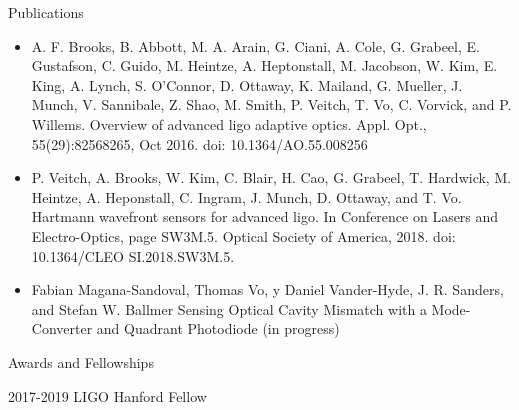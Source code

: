 \documentclass[suthesis,12pt,notitlepage]{report}
\begin{document}
\noindent Publications

\begin{itemize}
	\item{A. F. Brooks, B. Abbott, M. A. Arain, G. Ciani, A. Cole, G. Grabeel, E. Gustafson,
	C. Guido, M. Heintze, A. Heptonstall, M. Jacobson, W. Kim, E. King, A. Lynch,
	S. O’Connor, D. Ottaway, K. Mailand, G. Mueller, J. Munch, V. Sannibale, Z. Shao,
	M. Smith, P. Veitch, T. Vo, C. Vorvick, and P. Willems. Overview of advanced ligo
	adaptive optics. Appl. Opt., 55(29):8256{8265, Oct 2016. doi: 10.1364/AO.55.008256}}
	\item{P. Veitch, A. Brooks, W. Kim, C. Blair, H. Cao, G. Grabeel, T. Hardwick, M. Heintze,
	A. Heponstall, C. Ingram, J. Munch, D. Ottaway, and T. Vo. Hartmann wavefront
	sensors for advanced ligo. In Conference on Lasers and Electro-Optics, page SW3M.5.
	Optical Society of America, 2018. doi: 10.1364/CLEO SI.2018.SW3M.5.}
	\item{Fabian Magana-Sandoval, Thomas Vo, y Daniel Vander-Hyde, J. R. Sanders, and Stefan W. Ballmer Sensing Optical Cavity Mismatch with a Mode-Converter and Quadrant Photodiode (in progress)}
\end{itemize} 

\noindent Awards and Fellowships

2017-2019 LIGO Hanford Fellow

\finishvita
\end{document}
